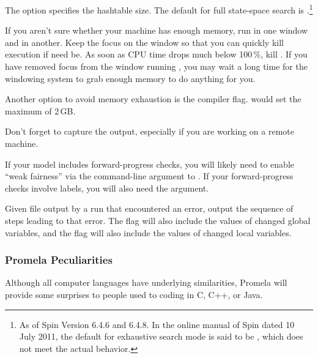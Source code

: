\begin{description}[style=nextline]
	The  option specifies the hashtable size.
	The default for full state-space search is .\footnote{
		As of Spin Version 6.4.6 and 6.4.8.
		In the online manual of Spin dated 10 July 2011, the
		default for exhaustive search mode is said to be ,
		which does not meet the actual behavior.}

	If you aren't sure whether your machine has enough memory,
	run  in one window and  in another.
	Keep the focus on the  window so that you can quickly
	kill execution if need be.
	As soon as CPU time drops much below 100\,\%, kill .
	If you have removed focus from the window running ,
	you may wait a long time for the windowing system to grab
	enough memory to do anything for you.

	Another option to avoid memory exhaustion is the
	 compiler flag.
	 would set the maximum of 2\,GB.

	Don't forget to capture the output, especially
	if you are working on a remote machine.

	If your model includes forward-progress checks, you will likely
	need to enable ``weak fairness'' via the  command-line
	argument to .
	If your forward-progress checks involve  labels,
	you will also need the  argument.
\item	[\tco{spin -t -p qrcu.spin}]
	Given  file output by a run that encountered an
	error, output the sequence of steps leading to that error.
	The  flag will also include the values of changed
	global variables, and the   flag will also include
	the values of changed local variables.
\end{description}

\subsubsection{Promela Peculiarities}
\label{sec:formal:Promela Peculiarities}

Although all computer languages have underlying similarities,
Promela will provide some surprises to people used to coding in C,
C++, or Java.

